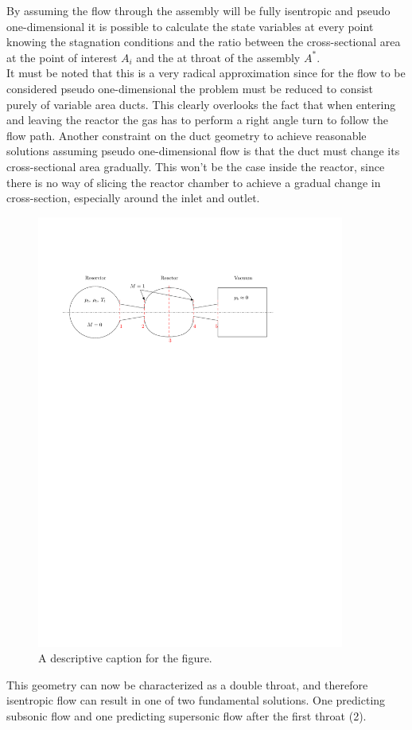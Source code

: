 By assuming the flow through the assembly will be fully isentropic and pseudo one-dimensional it is possible to calculate the state variables at every point knowing the stagnation conditions and the ratio between the cross-sectional area at the point of interest $A_i$ and the at throat of the assembly $A^*$.\\
It must be noted that this is a very radical approximation since for the flow to be  considered pseudo one-dimensional the problem must be reduced to consist purely of variable area ducts.
This clearly overlooks the fact that when entering and leaving the reactor the gas has to perform a right angle turn to follow the flow path.
Another constraint on the duct geometry to achieve reasonable solutions assuming pseudo one-dimensional flow is that the duct must change its cross-sectional area gradually.
\cite{anderson2021modern}
This won't be the case inside the reactor, since there is no way of slicing the reactor chamber to achieve a gradual change in cross-section, especially around the inlet and outlet.
\begin{figure}[H]
    \centering
    \includegraphics[width=0.9\textwidth]{src/03_analytical-work/fig_1d-flow-geometry}
    \caption{A descriptive caption for the figure.}
    \label{fig:example_figure}
\end{figure}
This geometry can now be characterized as a double throat, and therefore isentropic flow can result in one of two fundamental solutions.
One predicting subsonic flow and one predicting supersonic flow after the first throat (2).
\cite{SALAS1986193}
\cite{EMMONS1958}
